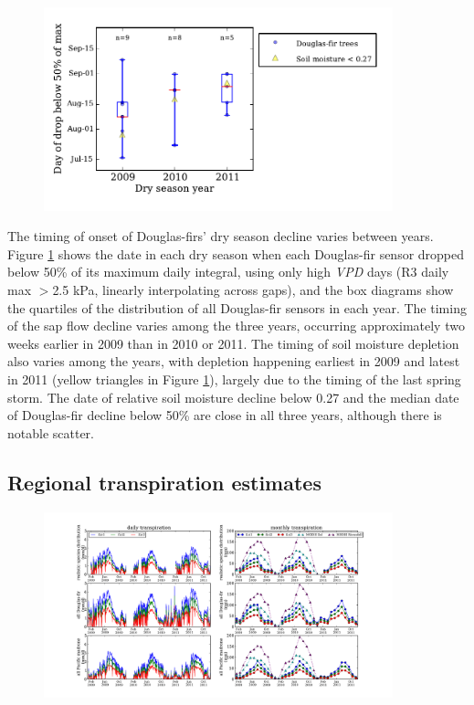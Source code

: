 \begin{figure}[here]
\includegraphics[width=0.9\textwidth]{ch1-sapflow/figures/Figure09.pdf}
\caption{}
\label{fig:sapflow_interannual}
\end{figure}

The timing of onset of Douglas-firs' dry season decline varies between years.  Figure \ref{fig:sapflow_interannual} shows the date in each dry season when each Douglas-fir sensor dropped below 50\% of its maximum daily integral, using only high \textit{VPD} days (R3 daily max $>$2.5 kPa, linearly interpolating across gaps), and the box diagrams show the quartiles of the distribution of all Douglas-fir sensors in each year.  The timing of the sap flow decline varies among the three years, occurring approximately two weeks earlier in 2009 than in 2010 or 2011.  The timing of soil moisture depletion also varies among the years, with depletion happening earliest in 2009 and latest in 2011 (yellow triangles in Figure \ref{fig:sapflow_interannual}), largely due to the timing of the last spring storm.  The date of relative soil moisture decline below 0.27 and the median date of Douglas-fir decline below 50\% are close in all three years, although there is notable scatter.

\subsection{Regional transpiration estimates}

\begin{figure}[here]
\includegraphics[width=0.9\textwidth]{ch1-sapflow/figures/Figure10.pdf}
\caption{}
\label{fig:sapflow_regional}
\end{figure}

